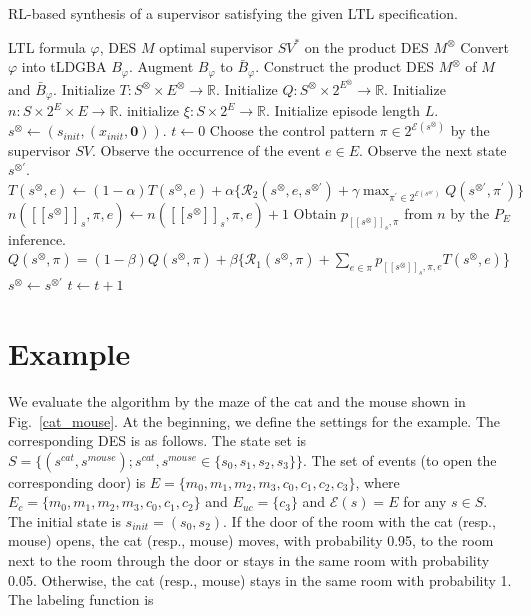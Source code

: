 \documentclass[10 pt, dvipdfmx]{article}
\theoremstyle{definition}
\newcommand{\mysps}{\ensuremath{[\![s^{\otimes}]\!]}_s}
\newcommand{\myspq}{\ensuremath{[\![s^{\otimes}]\!]}_q}
\begin{document}
\begin{algorithm}[H]
 \caption{RL-based synthesis of a supervisor satisfying the given LTL specification.}
 \begin{algorithmic}[1]
 \renewcommand{\algorithmicrequire}{\textbf{Input:}}
 \renewcommand{\algorithmicensure}{\textbf{Output:}}
 \REQUIRE LTL formula $\varphi$, DES $M$
 \ENSURE  optimal supervisor $SV^{\ast}$ on the product DES $M^{\otimes}$
  \STATE Convert $\varphi$ into tLDGBA $B_{\varphi}$.
  \STATE Augment $B_{\varphi}$ to $\bar{B}_{\varphi}$.
  \STATE Construct the product DES $M^{\otimes}$ of $M$ and $\bar{B}_{\varphi}$.
  \STATE Initialize $T:S^{\otimes} \times E^{\otimes} \rightarrow \mathbb{R}$.
  \STATE Initialize $Q:S^{\otimes} \times 2^{E^{\otimes}} \rightarrow \mathbb{R}$.
  \STATE Initialize $n:S \times 2^{E} \times E \rightarrow \mathbb{R}$.
  \STATE initialize $\xi:S \times 2^{E} \rightarrow \mathbb{R}$.
  \STATE Initialize episode length $L$.
  \STATE $s^{\otimes} \leftarrow (s_{init},(x_{init},\bm{0}))$.
  \STATE $t \leftarrow 0$
  \WHILE {$t <L$ and $\myspq \notin SinkSet$ }
  \STATE Choose the control pattern $\pi \in 2^{\mathcal{E}(s^{\otimes})}$ by the supervisor $SV$.
  \STATE Observe the occurrence of the event $e \in E$.
  \STATE Observe the next state $s^{\otimes \prime}$.
  \STATE $T(s^{\otimes},e) \leftarrow (1-\alpha)T(s^{\otimes},e) + \alpha \{\mathcal{R}_2(s^{\otimes},e,s^{\otimes \prime}) + \gamma \max_{\pi^{\prime} \in 2^{\mathcal{E}(s^{\otimes \prime})}}Q(s^{\otimes \prime},\pi^{\prime})\}$
  \STATE $n(\mysps, \pi, e) \leftarrow n(\mysps, \pi, e) + 1$
  \STATE Obtain $p_{\mysps,\pi}$ from $n$ by the $P_E$ inference.
  \STATE $Q(s^{\otimes},\pi) = (1-\beta)Q(s^{\otimes},\pi) + \beta \{\mathcal{R}_1(s^{\otimes},\pi) + \sum_{e \in \pi} p_{\mysps,\pi,e} T(s^{\otimes},e)$\}
  \STATE $s^{\otimes} \leftarrow s^{\otimes \prime}$
  \STATE $t \leftarrow t + 1$
  \ENDWHILE
  \ENDWHILE
 \end{algorithmic}
 \label{alg1}
 \end{algorithm}

\section{Example}
We evaluate the algorithm by the maze of the cat and the mouse shown in Fig.\ \ref{cat_mouse}. At the beginning, we define the settings for the example. The corresponding DES is as follows. The state set is $S = \{ (s^{cat}, s^{mouse}) ; s^{cat},s^{mouse} \in \{ s_0,s_1,s_2,s_3 \} \}$. The set of events (to open the corresponding door) is $E = \{ m_0, m_1, m_2, m_3, c_0, c_1, c_2, c_3 \}$, where $E_{c} = \{ m_0, m_1, m_2, m_3, c_0, c_1, c_2 \}$ and $E_{uc} = \{ c_3 \}$ and $\mathcal{E}(s) = E$ for any $s \in S$. The initial state is $s_{init} = (s_0, s_2)$. If the door of the room with the cat (resp., mouse) opens, the cat (resp., mouse) moves, with probability 0.95, to the room next to the room through the door or stays in the same room with probability 0.05. Otherwise, the cat (resp., mouse) stays in the same room with probability 1. The labeling function is
\end{document}

